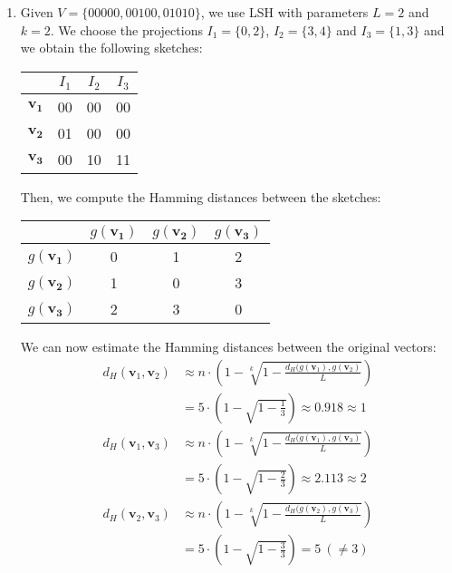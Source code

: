 \begin{enumerate}
  \item Given $V = \{00000, 00100, 01010\}$, we use LSH with parameters $L = 2$
  and $k = 2$. We choose the projections $I_1 = \{ 0, 2 \}$, $I_2 = \{ 3, 4
  \}$ and $I_3 = \{1, 3 \}$ and we obtain the following sketches:
  \begin{table}[H]
    \centering
    \begin{tabular}{c|c|c|c|}
      & $I_1$ & $I_2$ & $I_3$ \\ \hline
      $\mathbf{v_1}$ & 00 & 00 & 00\\ \hline
      $\mathbf{v_2}$ & 01 & 00 & 00\\ \hline
      $\mathbf{v_3}$ & 00 & 10 & 11\\ \hline
    \end{tabular}
  \end{table}
  Then, we compute the Hamming distances between the sketches:
  \begin{table}[H]
    \centering
    \begin{tabular}{c|c|c|c|}
      & $g(\mathbf{v_1})$ & $g(\mathbf{v_2})$ & $g(\mathbf{v_3})$ \\ \hline
      $g(\mathbf{v_1})$ & 0 & 1 & 2 \\ \hline
      $g(\mathbf{v_2})$ & 1 & 0 & 3 \\ \hline
      $g(\mathbf{v_3})$ & 2 & 3 & 0 \\ \hline
    \end{tabular}
  \end{table}
  We can now estimate the Hamming distances between the original vectors:
  \begin{align*}
    d_H(\mathbf{v}_1, \mathbf{v}_2) &\approx
    n \cdot \left( 1 - \sqrt[k]{1 - \frac{d_H(g(\mathbf{v}_1),
    g(\mathbf{v}_2)}{L}} \right) \\
    &= 5 \cdot \left( 1 - \sqrt{1 - \frac{1}{3}} \right) \approx 0.918
    \approx 1 \\
    d_H(\mathbf{v}_1, \mathbf{v}_3) &\approx
    n \cdot \left( 1 - \sqrt[k]{1 - \frac{d_H(g(\mathbf{v}_1),
    g(\mathbf{v}_3)}{L}} \right) \\
    &= 5 \cdot \left( 1 - \sqrt{1 - \frac{2}{3}} \right) \approx 2.113
    \approx 2 \\
    d_H(\mathbf{v}_2, \mathbf{v}_3) &\approx
    n \cdot \left( 1 - \sqrt[k]{1 - \frac{d_H(g(\mathbf{v}_2),
    g(\mathbf{v}_3)}{L}} \right) \\
    &= 5 \cdot \left( 1 - \sqrt{1 - \frac{3}{3}} \right) = 5\ (\neq 3) \\
  \end{align*}

\end{enumerate}
